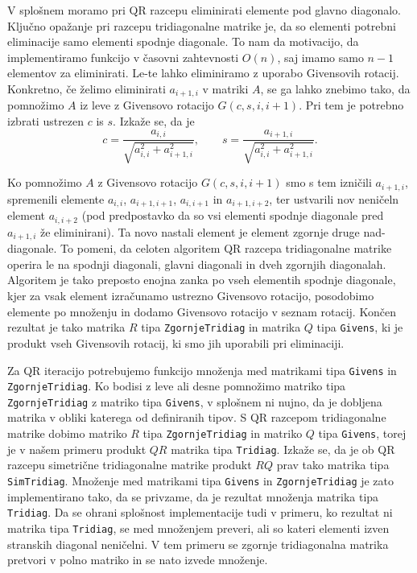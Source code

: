 \documentclass[11pt, titlepage]{article}
\begin{document}
V splošnem moramo pri QR razcepu eliminirati elemente pod glavno diagonalo. Ključno opažanje pri razcepu tridiagonalne matrike je, da so elementi potrebni eliminacije samo elementi spodnje diagonale.
To nam da motivacijo, da implementiramo funkcijo v časovni zahtevnosti $O(n)$, saj imamo samo $n-1$ elementov za eliminirati. Le-te lahko eliminiramo z uporabo Givensovih rotacij.
Konkretno, če želimo eliminirati $a_{i+1,i}$ v matriki $A$, se ga lahko znebimo tako, da pomnožimo $A$ iz leve z Givensovo rotacijo $G(c,s,i,i+1)$. Pri tem je potrebno izbrati ustrezen $c$ is $s$.
Izkaže se, da je
$$
c = \frac{a_{i,i}}{\sqrt{a_{i,i}^2 + a_{i+1,i}^2}}, \qquad s = \frac{a_{i+1,i}}{\sqrt{a_{i,i}^2 + a_{i+1,i}^2}}.
$$ 

Ko pomnožimo $A$ z Givensovo rotacijo $G(c,s,i,i+1)$ smo s tem izničili $a_{i+1,i}$, spremenili elemente $a_{i,i}$, $a_{i+1,i+1}$, $a_{i,i+1}$ in $a_{i+1,i+2}$, ter ustvarili nov neničeln element $a_{i,i+2}$ (pod predpostavko da so vsi elementi spodnje diagonale pred $a_{i+1,i}$ že eliminirani). Ta novo nastali element je element zgornje druge nad-diagonale.
To pomeni, da celoten algoritem QR razcepa tridiagonalne matrike operira le na spodnji diagonali, glavni diagonali in dveh zgornjih diagonalah.
Algoritem je tako preposto enojna zanka po vseh elementih spodnje diagonale, kjer za vsak element izračunamo ustrezno Givensovo rotacijo, posodobimo elemente po množenju in dodamo Givensovo rotacijo v seznam rotacij.
Končen rezultat je tako matrika $R$ tipa \texttt{ZgornjeTridiag} in matrika $Q$ tipa \texttt{Givens}, ki je produkt vseh Givensovih rotacij, ki smo jih uporabili pri eliminaciji.

Za QR iteracijo potrebujemo funkcijo množenja med matrikami tipa \texttt{Givens} in \texttt{ZgornjeTridiag}. Ko bodisi z leve ali desne pomnožimo matriko tipa \texttt{ZgornjeTridiag}
z matriko tipa \texttt{Givens}, v splošnem ni nujno, da je dobljena matrika v obliki katerega od definiranih tipov. S QR razcepom tridiagonalne matrike dobimo matriko $R$ tipa \texttt{ZgornjeTridiag} in matriko $Q$ tipa \texttt{Givens}, torej je v našem
primeru produkt $QR$ matrika tipa \texttt{Tridiag}. Izkaže se, da je ob QR razcepu simetrične tridiagonalne matrike produkt $RQ$ prav tako matrika tipa \texttt{SimTridiag}. Množenje med matrikami tipa \texttt{Givens} in \texttt{ZgornjeTridiag} je zato implementirano tako,
da se privzame, da je rezultat množenja matrika tipa \texttt{Tridiag}. Da se ohrani splošnost implementacije tudi v primeru, ko rezultat ni matrika tipa \texttt{Tridiag}, se med množenjem preveri, ali so kateri elementi izven stranskih diagonal neničelni.
V tem primeru se zgornje tridiagonalna matrika pretvori v polno matriko in se nato izvede množenje.
\end{document}
